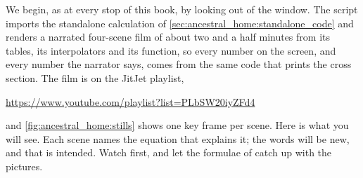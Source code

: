 We begin, as at every stop of this book, by looking out of the window. The
script 
imports the standalone calculation of \cref{sec:ancestral_home:standalone_code}
and renders a narrated four-scene film of about two and a half minutes from
its tables, its interpolators and its  function, so every
number on the screen, and every number the narrator says, comes from the same
code that prints the cross section. The film is
on the JitJet playlist,
\begin{center}
  \url{https://www.youtube.com/playlist?list=PLbSW20iyZFd4}
\end{center}
and \cref{fig:ancestral_home:stills} shows one key frame per scene. Here is
what you will see. Each scene names the equation that explains it; the words
will be new, and that is intended. Watch first, and let the formulae of
catch up with the pictures.
